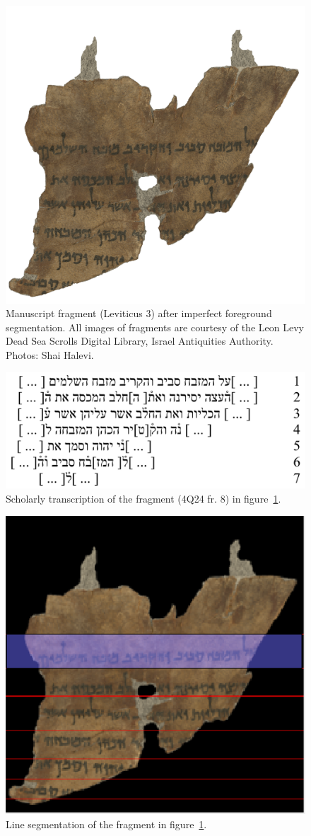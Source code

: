\begin{figure}[t] \centering
	\includegraphics[width=.5\textwidth]{images/ms.png}
	\caption{Manuscript fragment (Leviticus 3) after imperfect foreground
	segmentation. All images of fragments are courtesy of the Leon Levy
	Dead Sea Scrolls Digital Library, Israel Antiquities Authority. Photos:
	Shai Halevi.\label{fig:algn_ms}}
\end{figure}

\begin{figure}[t] \centering
	\includegraphics[width=.7\textwidth]{images/4Q24_f8.png} 
	\caption{Scholarly transcription of the fragment (4Q24 fr. 8) in figure~\protect\ref{fig:algn_ms}.}
	\label{fig:algn_trans}
\end{figure}

\begin{figure}[t] \centering
	\includegraphics[width=.5\textwidth]{images/lines.png}
	\caption{Line segmentation of the fragment in figure~\protect\ref{fig:algn_ms}.}
	\label{fig:algn_lines}
\end{figure}

